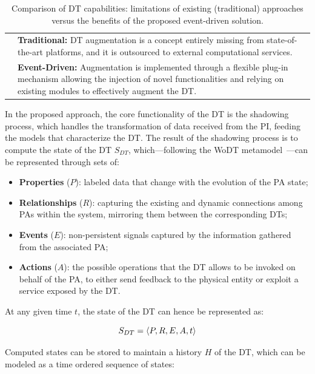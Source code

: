 \begin{table}
\begin{tabularx}{\textwidth}{>{\arraybackslash}m{2.5cm} >{\arraybackslash}X}
\multirow{2}{*}{\textbf{Augmentation}} 
& \textbf{Traditional:} DT augmentation is a concept entirely missing from state-of-the-art platforms, and it is outsourced to external computational services. \\
& \textbf{Event-Driven:} Augmentation is implemented through a flexible plug-in mechanism allowing the injection of novel functionalities and relying on existing modules to effectively augment the DT. \\ \hline
\end{tabularx}

\caption{Comparison of DT capabilities: limitations of existing (traditional) approaches versus the benefits of the proposed event-driven solution.}
\label{tab:evaluation}
\end{table}

In the proposed approach, the core functionality of the \ac{DT} is the shadowing process, which handles the transformation of data received from the \ac{PI}, feeding the models that characterize the \ac{DT}.
%
The result of the shadowing process is to compute the state of the \ac{DT} $S_{DT}$, which---following the \ac{WoDT} metamodel~\cite{web-of-dt-ricci-2022}---can be represented through sets of: 
\begin{itemize}
\item \textbf{Properties} ($P$): labeled data that change with the evolution of the \ac{PA} state;
\item \textbf{Relationships} ($R$): capturing the existing and dynamic connections among \acp{PA} within the system, mirroring them between the corresponding \acp{DT}; 
\item \textbf{Events} ($E$): non-persistent signals captured by the information gathered from the associated \ac{PA};
\item \textbf{Actions} ($A$): the possible operations that the \ac{DT} allows to be invoked on behalf of the \ac{PA}, to either send feedback to the physical entity or exploit a service exposed by the \ac{DT}.
\end{itemize}

At any given time $t$, the state of the \ac{DT} can hence be represented as: 

\begin{equation}
    S_{DT} = \langle P, R, E, A, t \rangle \\
\end{equation}

Computed states can be stored to maintain a history $H$ of the \ac{DT}, which can be modeled as a time ordered sequence of states:

